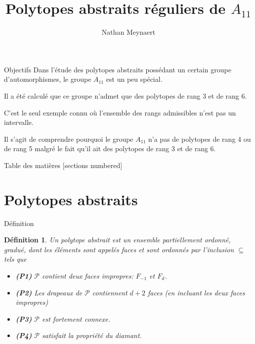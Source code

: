 \documentclass[10pt]{beamer}
\title{Polytopes abstraits réguliers de $A_{11}$}
\date{}
\author{Nathan Meynaert}
\newtheorem{definition}{Définition}[section]
\begin{document}
\maketitle

\begin{frame}{Objectifs}
  Dans l'étude des polytopes abstraits possédant un certain groupe d'automorphismes, le groupe $A_{11}$ est un peu spécial.

  Il a été calculé que ce groupe n'admet que des polytopes de rang 3 et de rang 6.

  C'est le seul exemple connu où l'ensemble des rangs admissibles n'est pas un intervalle.

  Il s'agit de comprendre pourquoi le groupe $A_{11}$ n'a pas de polytopes de rang 4 ou de rang 5 malgré le fait qu'il ait des polytopes de rang 3 et de rang 6.
\end{frame}

\begin{frame}{Table des matières}
  [sections numbered]
  \tableofcontents[hideallsubsections]
\end{frame}

\section{Polytopes abstraits}

\begin{frame}{Définition}

  \begin{definition}
    Un \textit{polytope abstrait} est un ensemble partiellement ordonné, gradué,  dont les éléments sont appelés \textit{faces} et sont ordonnés par l'inclusion $\subseteq$ tels que
    \begin{itemize}
      \item \textbf{(P1)} $\mathcal P$ contient deux faces impropres: $F_{-1}$ et $F_d$.
      \item \textbf{(P2)} Les drapeaux de $\mathcal P$ contiennent $d+2$ faces (en incluant les deux faces impropres)    \item \textbf{(P3)} $\mathcal P$ est fortement connexe.
      \item \textbf{(P4)} $\mathcal P$ satisfait la propriété du diamant.
    \end{itemize}
  \end{definition}

\end{frame}
\end{document}
